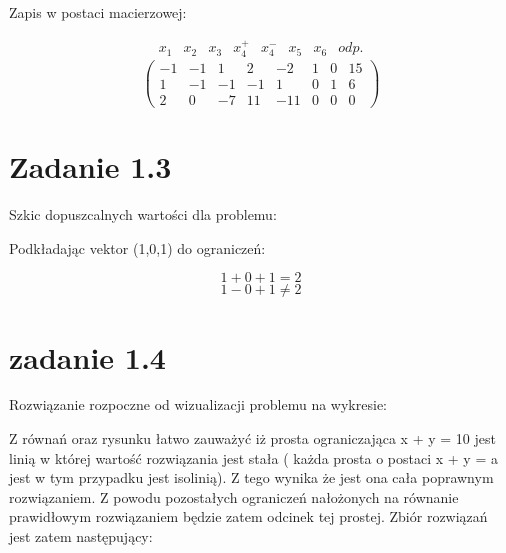 \documentclass[paper=a4, fontsize=11pt]{scrartcl} %
\numberwithin{equation}{section} %
\numberwithin{figure}{section} %
\numberwithin{table}{section} %
\begin{document}
Zapis w postaci macierzowej:

\[ 
  \begin{array}{cccccccc}
    x_1 & x_2 & x_3 & x_4^+ & x_4^- & x_5 & x_6 & odp. 
\end{array} \]
\[
  \left( \begin{array}{cccccccc}
      -1 & -1 & 1 & 2 & -2 & 1 & 0 & 15 \\
      1 & -1 & -1 & -1 & 1 & 0 & 1 & 6  \\
      2 & 0  & -7  & 11 & -11 & 0 & 0 & 0
\end{array} \right)\] 

\newpage
\section{Zadanie 1.3}


Szkic dopuszcalnych wartości dla problemu:


Podkładając vektor (1,0,1) do ograniczeń:

\[1 + 0 + 1 = 2\]
\[1 - 0 + 1 \neq 2\]


\newpage
\section{zadanie 1.4}

Rozwiązanie rozpoczne od wizualizacji problemu na wykresie:


Z równań oraz rysunku łatwo zauważyć iż prosta ograniczająca x + y = 10 jest linią w której wartość rozwiązania jest stała ( każda prosta o postaci x + y = a jest w tym przypadku jest isolinią).
Z tego wynika że jest ona cała poprawnym rozwiązaniem. Z powodu pozostałych ograniczeń nałożonych na równanie prawidłowym rozwiązaniem będzie zatem odcinek tej prostej.
Zbiór rozwiązań jest zatem następujący:
\end{document}
